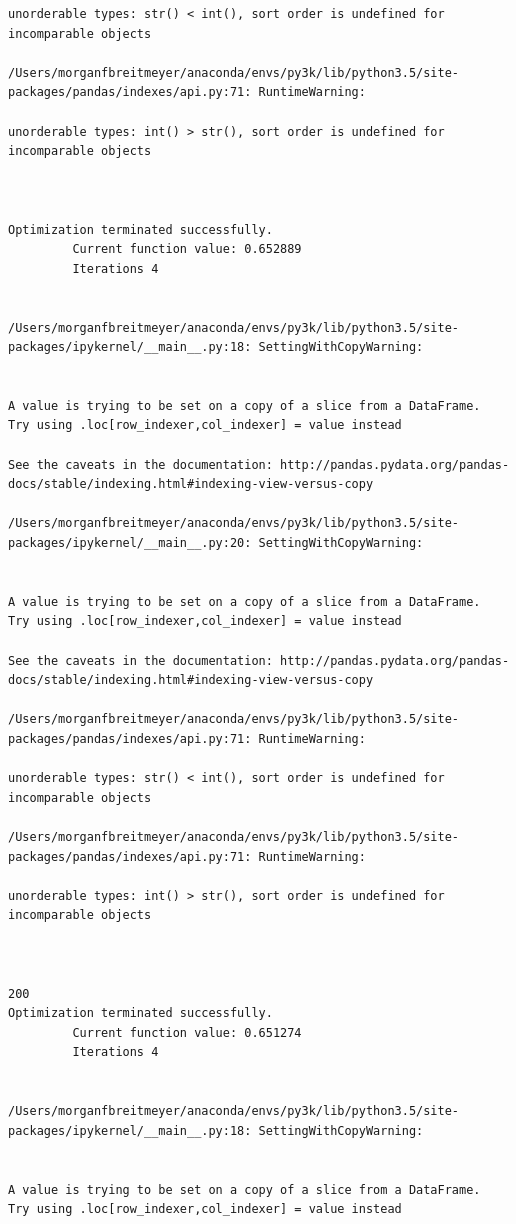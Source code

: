 \begin{lstlisting}
unorderable types: str() < int(), sort order is undefined for incomparable objects

/Users/morganfbreitmeyer/anaconda/envs/py3k/lib/python3.5/site-packages/pandas/indexes/api.py:71: RuntimeWarning:

unorderable types: int() > str(), sort order is undefined for incomparable objects



Optimization terminated successfully.
         Current function value: 0.652889
         Iterations 4


/Users/morganfbreitmeyer/anaconda/envs/py3k/lib/python3.5/site-packages/ipykernel/__main__.py:18: SettingWithCopyWarning:


A value is trying to be set on a copy of a slice from a DataFrame.
Try using .loc[row_indexer,col_indexer] = value instead

See the caveats in the documentation: http://pandas.pydata.org/pandas-docs/stable/indexing.html#indexing-view-versus-copy

/Users/morganfbreitmeyer/anaconda/envs/py3k/lib/python3.5/site-packages/ipykernel/__main__.py:20: SettingWithCopyWarning:


A value is trying to be set on a copy of a slice from a DataFrame.
Try using .loc[row_indexer,col_indexer] = value instead

See the caveats in the documentation: http://pandas.pydata.org/pandas-docs/stable/indexing.html#indexing-view-versus-copy

/Users/morganfbreitmeyer/anaconda/envs/py3k/lib/python3.5/site-packages/pandas/indexes/api.py:71: RuntimeWarning:

unorderable types: str() < int(), sort order is undefined for incomparable objects

/Users/morganfbreitmeyer/anaconda/envs/py3k/lib/python3.5/site-packages/pandas/indexes/api.py:71: RuntimeWarning:

unorderable types: int() > str(), sort order is undefined for incomparable objects



200
Optimization terminated successfully.
         Current function value: 0.651274
         Iterations 4


/Users/morganfbreitmeyer/anaconda/envs/py3k/lib/python3.5/site-packages/ipykernel/__main__.py:18: SettingWithCopyWarning:


A value is trying to be set on a copy of a slice from a DataFrame.
Try using .loc[row_indexer,col_indexer] = value instead


\end{lstlisting}
